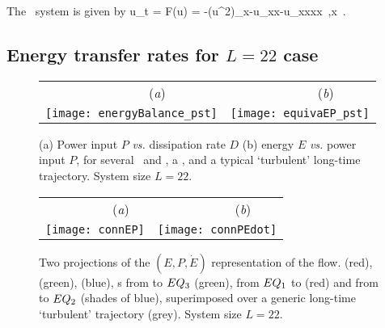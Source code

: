 The \KS\ system is given by
\beq
  u_t = F(u) = -{\textstyle{}}(u^2)_x-u_{xx}-u_{xxxx}
    \,,\qquad   x \in [-L/2,L/2]
    \,.

\subsection{Energy transfer rates for $L=22$ case}
\label{sec:energyL22}

\begin{figure}[t]
\begin{center}
 \begin{tabular}{cc}
        ~~~~~~~~(\textit{a})                        &   ~~~~~~~~(\textit{b}) \\
    \texttt{[image: energyBalance\_pst]}
    & \texttt{[image: equivaEP\_pst]}

  \end{tabular}
\end{center}
\caption{
(a) Power input $P$ {\em vs.}
dissipation rate $D$
(b) energy $E$  {\em vs.}
power input $P$,   for several  \eqva\ and \reqva,
a \rpo, and a typical `turbulent' long-time trajectory.
System size $L=22$.
        }
\label{f:drivedrag1}
\end{figure}

\begin{figure}[t]
\begin{center}
 \begin{tabular}{cc}
        ~~~~~~~~(\textit{a})                        &   ~~~~~~~~(\textit{b}) \\
    \texttt{[image: connEP]}
     & \texttt{[image: connPEdot]}
 \end{tabular}
\end{center}
\caption{
Two projections of the $(E,P,\dot{E})$ representation of the flow.
 (red),  (green),  (blue),
\hec s from  to $EQ_{3}$ (green),
from $EQ_{1}$ to  (red)
and from  to $EQ_{2}$ (shades of blue), superimposed over
a generic long-time `turbulent' trajectory (grey).
System size $L=22$.
        }
\label{f:drivedragConn}
\end{figure}

